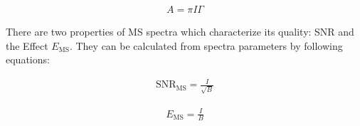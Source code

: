 \begin{equation}
\begin{aligned}
A = \pi I \Gamma
\end{aligned}
\label{area}
\end{equation}

There are two properties of MS spectra which characterize its quality: SNR and the Effect $E_{\textrm{MS}}$. They can be calculated from spectra parameters by following equations:

\begin{equation}
\begin{aligned}
\textrm{SNR}_{\textrm{MS}} = \frac{I}{\sqrt{B}}
\end{aligned}
\label{SNR}
\end{equation}

\begin{equation}
\begin{aligned}
E_{\textrm{MS}} = \frac{I}{B}
\end{aligned}
\label{effect}
\end{equation}



